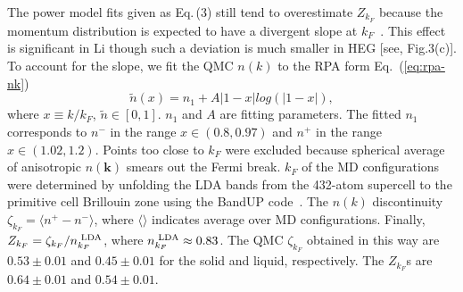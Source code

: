 \documentclass[twocolumn,showpacs,showkeys,fleqn,prl,superscriptaddress]{revtex4}%
\newcommand{\nn}[1]{\textnormal{ #1}}
\begin{document}
\vspace{10mm}

The power model fits given as Eq.\,(3) still tend to overestimate $Z_{k_F}$ because the momentum distribution is expected to have a divergent slope at $k_F$~\cite{gg02}. 
This effect is significant in Li though such a deviation is much smaller in HEG [see, Fig.3(c)]. 
To account for the slope, we fit the QMC $n(k)$ to the RPA form Eq.~(\ref{eq:rpa-nk})
\begin{equation} \label{eq:rpa-nk}
\tilde{n}(x) = n_1 + A\vert 1-x\vert log\left(\vert 1-x\vert\right),
\end{equation}
where $x\equiv k/k_F$, $\tilde{n}\in[0,1]$. $n_1$ and $A$ are fitting parameters. The fitted $n_1$ corresponds to $n^-$ in the range $x\in(0.8, 0.97)$ and $n^+$ in the range $x\in(1.02, 1.2)$. Points too close to $k_F$ were excluded because spherical average of anisotropic $n(\boldsymbol{k})$ smears out the Fermi break. $k_F$ of the MD configurations were determined by unfolding the LDA bands from the 432-atom supercell to the primitive cell Brillouin zone using the BandUP code~\cite{Medeiros2014,Medeiros2015}. The $n(k)$ discontinuity $\zeta_{k_F}= \langle n^+-n^-\rangle$, where $\langle\rangle$ indicates average over MD configurations. Finally, $Z_{k_F} = \zeta_{k_F}/n_{k_F}^{\nn{LDA}}$, where $n_{k_F}^\nn{LDA}\approx0.83$. The QMC $\zeta_{k_F}$ obtained in this way are $0.53\pm0.01$ and $0.45\pm0.01$ for the solid and liquid, respectively. The $Z_{k_F}$s are $0.64\pm0.01$ and $0.54\pm0.01$.

\end{document}
